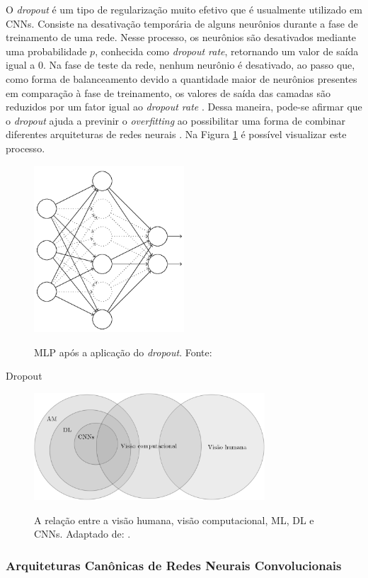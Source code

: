 O \emph{dropout} é um tipo de regularização muito efetivo que é usualmente utilizado em CNNs. Consiste na desativação temporária de alguns neurônios durante a fase de treinamento de uma rede. Nesse processo, os neurônios são desativados mediante uma probabilidade $p$, conhecida como \emph{dropout rate}, retornando um valor de saída igual a $0$. Na fase de teste da rede, nenhum neurônio é desativado, ao passo que, como forma de balanceamento devido a quantidade maior de neurônios presentes em comparação à fase de treinamento, os valores de saída das camadas são reduzidos por um fator igual ao \emph{dropout rate} \cite{chollet}. Dessa maneira, pode-se afirmar que o \emph{dropout} ajuda a previnir o \emph{overfitting} ao possibilitar uma forma de combinar diferentes arquiteturas de redes neurais \cite{buduma}. Na Figura \ref{fig:dropout} é possível visualizar este processo.

\begin{figure}[h!]
  \centering
  \caption{MLP após a aplicação do \emph{dropout}. Fonte: \cite{dsacademy}}
  \includegraphics[width=0.5\textwidth]{imgs/dropout-after}
  \label{fig:dropout}
\end{figure}

Dropout \cite{dsacademy}

\begin{figure}[h!]
  \centering
  \caption{A relação entre a visão humana, visão computacional, ML, DL e CNNs. Adaptado de: \cite{khan}.}
  \includegraphics[height=4cm]{imgs/areas-ia}
  \label{fig:areas-ia}
\end{figure}


\subsubsection{Arquiteturas Canônicas de Redes Neurais Convolucionais}
\label{subsubsec:arq-cnns}
